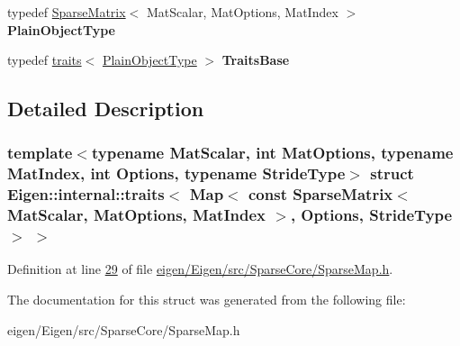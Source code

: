 \begin{DoxyCompactItemize}
typedef \hyperlink{group___sparse_core___module_class_eigen_1_1_sparse_matrix}{Sparse\+Matrix}$<$ Mat\+Scalar, Mat\+Options, Mat\+Index $>$ {\bfseries Plain\+Object\+Type}
\item 
\mbox{\label{struct_eigen_1_1internal_1_1traits_3_01_map_3_01const_01_sparse_matrix_3_01_mat_scalar_00_01_matec7066c11e5361dce6e4102c84e4bcd2_a12f305d44fd9b97871284d93cec976ca}} 
typedef \hyperlink{struct_eigen_1_1internal_1_1traits}{traits}$<$ \hyperlink{group___sparse_core___module_class_eigen_1_1_sparse_matrix}{Plain\+Object\+Type} $>$ {\bfseries Traits\+Base}
\end{DoxyCompactItemize}


\subsection{Detailed Description}
\subsubsection*{template$<$typename Mat\+Scalar, int Mat\+Options, typename Mat\+Index, int Options, typename Stride\+Type$>$\newline
struct Eigen\+::internal\+::traits$<$ Map$<$ const Sparse\+Matrix$<$ Mat\+Scalar, Mat\+Options, Mat\+Index $>$, Options, Stride\+Type $>$ $>$}



Definition at line \hyperlink{eigen_2_eigen_2src_2_sparse_core_2_sparse_map_8h_source_l00029}{29} of file \hyperlink{eigen_2_eigen_2src_2_sparse_core_2_sparse_map_8h_source}{eigen/\+Eigen/src/\+Sparse\+Core/\+Sparse\+Map.\+h}.



The documentation for this struct was generated from the following file\+:\begin{DoxyCompactItemize}
\item 
eigen/\+Eigen/src/\+Sparse\+Core/\+Sparse\+Map.\+h\end{DoxyCompactItemize}

